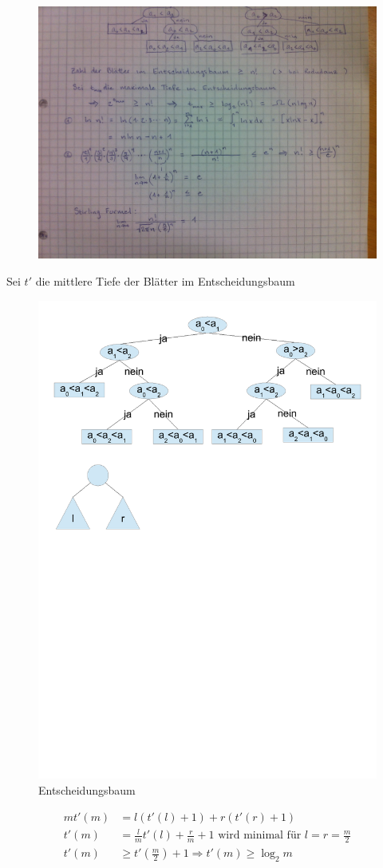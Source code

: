 \documentclass[a4paper,twoside,10pt]{report}
\begin{document}
\begin{figure}[H]\center
\includegraphics[width=\columnwidth]{figures/m1.jpg}
\end{figure}

Sei $t'$ die mittlere Tiefe der Blätter im Entscheidungsbaum
\begin{figure}[H]\center
\includegraphics[trim= .9cm 15cm 14.7cm 10cm,clip,width=.4\columnwidth]{figures/vergleichsbaum.pdf}
\caption{Entscheidungsbaum}
\end{figure}
\begin{align*}
mt'(m)&=l(t'(l)+1)+r(t'(r)+1)\\
t'(m)&=\frac{l}{m}t'(l)+\frac{r}{m}+1 \mbox{ wird minimal für } l=r=\frac{m}{2}\\
t'(m)&\ge t'(\frac{m}{2})+1 \Rightarrow t'(m)\ge\log_2m\end{align*}
\end{document}
